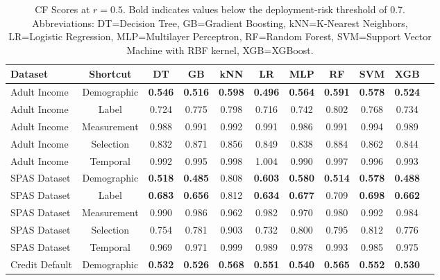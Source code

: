 \documentclass[conference]{IEEEtran}
\begin{document}
\begin{table}[t]
    \centering
    \footnotesize
    \setlength{\tabcolsep}{1.5pt}
    \caption{CF Scores at $r=0.5$. Bold indicates values below the deployment-risk threshold of 0.7. Abbreviations: DT=Decision Tree, GB=Gradient Boosting, kNN=K-Nearest Neighbors, LR=Logistic Regression, MLP=Multilayer Perceptron, RF=Random Forest, SVM=Support Vector Machine with RBF kernel, XGB=XGBoost.}
    \label{tab:cf_scores}
    \begin{tabular}{lcccccccccc}
        \toprule
        \textbf{Dataset} & \textbf{Shortcut} & \textbf{DT} & \textbf{GB} & \textbf{kNN} & \textbf{LR} & \textbf{MLP} & \textbf{RF} & \textbf{SVM} & \textbf{XGB} \\
        \midrule
        Adult Income & Demographic & \textbf{0.546} & \textbf{0.516} & \textbf{0.598} & \textbf{0.496} & \textbf{0.564} & \textbf{0.591} & \textbf{0.578} & \textbf{0.524} \\
        Adult Income & Label & 0.724 & 0.775 & 0.798 & 0.716 & 0.742 & 0.802 & 0.768 & 0.734 \\
        Adult Income & Measurement & 0.988 & 0.991 & 0.992 & 0.991 & 0.986 & 0.991 & 0.994 & 0.989 \\
        Adult Income & Selection & 0.832 & 0.871 & 0.856 & 0.849 & 0.838 & 0.884 & 0.862 & 0.844 \\
        Adult Income & Temporal & 0.992 & 0.995 & 0.998 & 1.004 & 0.990 & 0.997 & 0.996 & 0.993 \\
        \midrule
        SPAS Dataset & Demographic & \textbf{0.518} & \textbf{0.485} & 0.808 & \textbf{0.603} & \textbf{0.580} & \textbf{0.514} & \textbf{0.578} & \textbf{0.488} \\
        SPAS Dataset & Label & \textbf{0.683} & \textbf{0.656} & 0.812 & \textbf{0.634} & \textbf{0.677} & 0.709 & \textbf{0.698} & \textbf{0.662} \\
        SPAS Dataset & Measurement & 0.990 & 0.986 & 0.962 & 0.982 & 0.970 & 0.980 & 0.992 & 0.984 \\
        SPAS Dataset & Selection & 0.754 & 0.781 & 0.903 & 0.732 & 0.800 & 0.795 & 0.812 & 0.776 \\
        SPAS Dataset & Temporal & 0.969 & 0.971 & 0.999 & 0.989 & 0.978 & 0.993 & 0.985 & 0.975 \\
        \midrule
        Credit Default & Demographic & \textbf{0.532} & \textbf{0.526} & \textbf{0.568} & \textbf{0.551} & \textbf{0.540} & \textbf{0.565} & \textbf{0.552} & \textbf{0.530} \\

\end{tabular}
\end{table}
\end{document}
